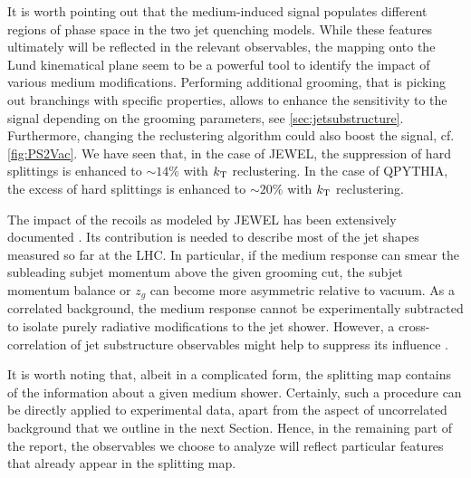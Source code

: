 
It is worth pointing out that the medium-induced signal populates different regions of phase space in the two jet quenching models. 
While these features ultimately will be reflected in the relevant observables, the mapping onto the Lund kinematical plane seem to be a powerful tool to identify the impact of various medium modifications. Performing additional grooming, that is picking out branchings with specific properties, allows to enhance the sensitivity to the signal depending on the grooming parameters, see \autoref{sec:jetsubstructure}. Furthermore, changing the reclustering algorithm could also boost the signal, cf. \autoref{fig:PS2Vac}.
We have seen that, in the case of JEWEL, the suppression of hard splittings is enhanced to $\sim 14\%$ with $k_{\rm \tiny T}$ reclustering. In the case of QPYTHIA, the excess of hard splittings is enhanced to $\sim 20\%$ with $k_{\rm \tiny T}$ reclustering.

The impact of the recoils as modeled by JEWEL has been extensively documented \cite{KunnawalkamElayavalli:2017hxo,Milhano:2017nzm}. Its contribution is needed to describe most of the jet shapes measured so far at the LHC. In particular, if the medium response can smear the subleading subjet momentum above the given grooming cut, the subjet momentum balance or $z_{g}$ can become more asymmetric relative to vacuum.   As a correlated background, the medium response cannot be experimentally subtracted to isolate purely radiative modifications to the jet shower. However, a cross-correlation of jet substructure observables might help to suppress its influence \cite{Milhano:2017nzm}.

It is worth noting that, albeit in a complicated form, the splitting map contains of the information about a given medium shower. Certainly, such a procedure can be directly applied to experimental data, apart from the aspect of uncorrelated background that we outline in the next Section. Hence, in the remaining part of the report, the observables we choose to analyze will reflect particular features that already appear in the splitting map.


